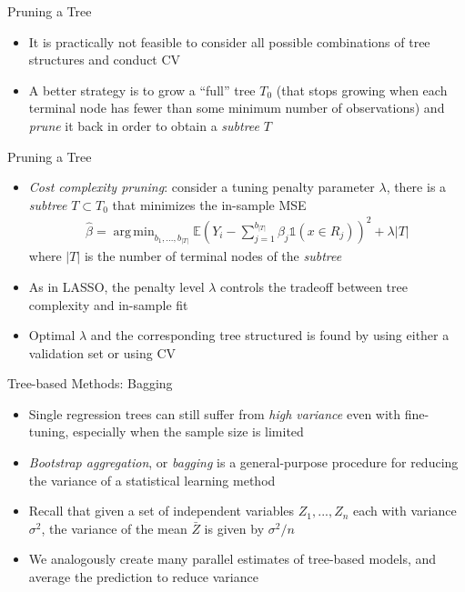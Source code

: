 \documentclass[aspectratio=1610,12pt,xcolor=dvipsnames]{beamer}
\DeclareMathOperator*{\argmin}{arg\,min}
\begin{document}
\begin{frame}{Pruning a Tree}

\begin{itemize}
    \item It is practically not feasible to consider all possible combinations of tree structures and conduct CV
    \item A better strategy is to grow a ``full'' tree $T_0$ (that stops growing when each terminal node has fewer than some minimum number of observations) and \textit{prune} it back in order to obtain a \textit{subtree} $T$
\end{itemize}
\end{frame}

\begin{frame}{Pruning a Tree}

\begin{itemize}
    \item \textit{Cost complexity pruning}: consider a tuning penalty parameter $\lambda$, there is a \textit{subtree} $T \subset T_0$ that minimizes the in-sample MSE
    \begin{align*}
        \hat \beta = \argmin_{b_1,...,b_{|T|}} \mathbb{E}\left( Y_i - \sum_{j=1}^{b_{|T|}} \beta_j \mathds{1} (x \in R_j) \right)^2 + \lambda |T|
    \end{align*}
    where $|T|$ is the number of terminal nodes of the \textit{subtree}
    \item As in LASSO, the penalty level $\lambda$ controls the tradeoff between tree complexity and in-sample fit
    \item Optimal $\lambda$ and the corresponding tree structured is found by using either a validation set or using CV
\end{itemize}
\end{frame}

\begin{frame}{Tree-based Methods: Bagging}

    \begin{itemize}
        \item Single regression trees can still suffer from \textit{high variance} even with fine-tuning, especially when the sample size is limited
        \item \textit{Bootstrap aggregation}, or \textit{bagging} is a general-purpose procedure for reducing the variance of a statistical learning method
        \item Recall that given a set of independent variables $Z_1,...,Z_n$ each with variance $\sigma^2$, the variance of the mean $\bar Z$ is given by $\sigma^2/n$
        \item We analogously create many parallel estimates of tree-based models, and average the prediction to reduce variance
    \end{itemize}
\end{frame}
\end{document}
